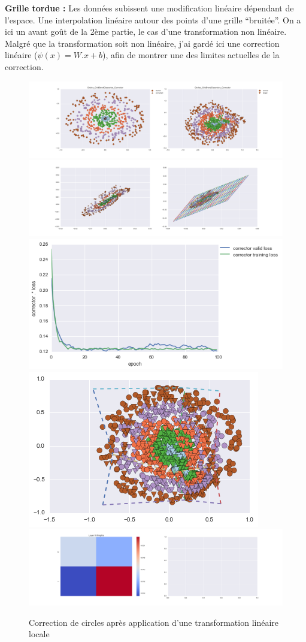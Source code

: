 {\Large \textbf{Grille tordue :}} Les données subissent une modification linéaire dépendant de l'espace.
Une interpolation linéaire autour des points d'une grille ``bruitée''.
On a ici un avant goût de la 2ème partie, le cas d'une transformation non linéaire.
Malgré que la transformation soit non linéaire, j'ai gardé ici une correction linéaire ($\psi(x) = W.x+b$),
afin de montrer une des limites actuelles de la correction.

\begin{figure}[H] %
\centering
\includegraphics[width=\linewidth]{fig/24-05-2016/circles/Circles_GridBendClasswise_Corrector-DATA.png}
\includegraphics[width=\linewidth]{fig/24-05-2016/circles/Circles_GridBendClasswise_Corrector-GridCheck.png}
\includegraphics[width=0.45\linewidth]{fig/24-05-2016/circles/Circles_GridBendClasswise_Corrector-Learning_curve.png}
\includegraphics[width=0.45\linewidth]{fig/24-05-2016/circles/circles_grid.png}
\includegraphics[width=\linewidth]{fig/24-05-2016/circles/Circles_GridBendClasswise_Corrector-W.png}
\caption{Correction de circles après application d'une transformation linéaire locale}
\label{fig:recap-circles-GridBend-classwise}
\end{figure}

